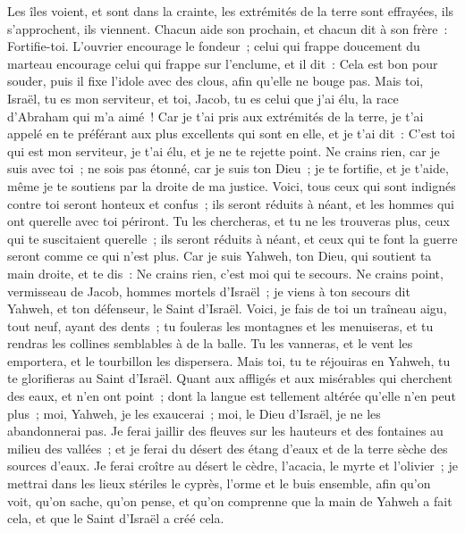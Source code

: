 \begin{multicols}{2}
Les îles voient, et sont dans la crainte, les extrémités de la terre sont effrayées, ils s'approchent, ils viennent.
Chacun aide son prochain, et chacun dit à son frère~: Fortifie-toi.
L'ouvrier encourage le fondeur~; celui qui frappe doucement du marteau encourage celui qui frappe sur l'enclume, et il dit~: Cela est bon pour souder, puis il fixe l'idole avec des clous, afin qu'elle ne bouge pas.
Mais toi, Israël, tu es mon serviteur, et toi, Jacob, tu es celui que j'ai élu, la race d'Abraham qui m'a aimé~!
Car je t'ai pris aux extrémités de la terre, je t'ai appelé en te préférant aux plus excellents qui sont en elle, et je t'ai dit~: C'est toi qui est mon serviteur, je t'ai élu, et je ne te rejette point.
Ne crains rien, car je suis avec toi~; ne sois pas étonné, car je suis ton Dieu~; je te fortifie, et je t'aide, même je te soutiens par la droite de ma justice.
Voici, tous ceux qui sont indignés contre toi seront honteux et confus~; ils seront réduits à néant, et les hommes qui ont querelle avec toi périront.
Tu les chercheras, et tu ne les trouveras plus, ceux qui te suscitaient querelle~; ils seront réduits à néant, et ceux qui te font la guerre seront comme ce qui n'est plus.
Car je suis Yahweh, ton Dieu, qui soutient ta main droite, et te dis~: Ne crains rien, c'est moi qui te secours.
Ne crains point, vermisseau de Jacob, hommes mortels d'Israël~; je viens à ton secours dit Yahweh, et ton défenseur, le Saint d'Israël.
Voici, je fais de toi un traîneau aigu, tout neuf, ayant des dents~; tu fouleras les montagnes et les menuiseras, et tu rendras les collines semblables à de la balle.
Tu les vanneras, et le vent les emportera, et le tourbillon les dispersera. Mais toi, tu te réjouiras en Yahweh, tu te glorifieras au Saint d'Israël.
Quant aux affligés et aux misérables qui cherchent des eaux, et n'en ont point~; dont la langue est tellement altérée qu'elle n'en peut plus~; moi, Yahweh, je les exaucerai~; moi, le Dieu d'Israël, je ne les abandonnerai pas.
Je ferai jaillir des fleuves sur les hauteurs et des fontaines au milieu des vallées~; et je ferai du désert des étang d'eaux et de la terre sèche des sources d'eaux.
Je ferai croître au désert le cèdre, l'acacia, le myrte et l'olivier~; je mettrai dans les lieux stériles le cyprès, l'orme et le buis ensemble,
afin qu'on voit, qu'on sache, qu'on pense, et qu'on comprenne que la main de Yahweh a fait cela, et que le Saint d'Israël a créé cela.

\end{multicols}
